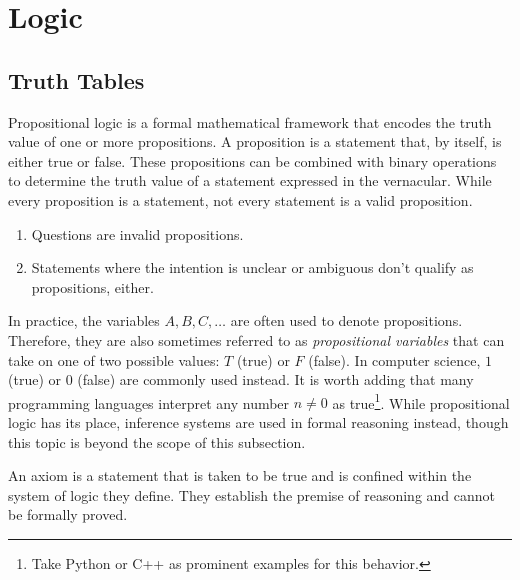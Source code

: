 \section{Logic}\label{sec-logic}


\subsection{Truth Tables}\label{subsec-truth-table}

Propositional logic is a formal mathematical framework that encodes the truth value
of one or more propositions. A proposition is a statement that, by itself, is either
true or false. These propositions can be combined with binary operations to determine
the truth value of a statement expressed in the vernacular. While every proposition
is a statement, not every statement is a valid proposition.

\begin{enumerate}
    \item Questions are invalid propositions.
    \item Statements where the intention is unclear or ambiguous don't qualify as propositions, either.
\end{enumerate}

In practice, the variables \(A,B,C,\dots\) are often used to denote propositions.
Therefore, they are also sometimes referred to as \emph{propositional variables}
that can take on one of two possible values: \(T\) (true) or \(F\) (false). In
computer science, \(1\) (true) or \(0\) (false) are commonly used instead. It is
worth adding that many programming languages interpret any number \(n\neq0\) as
true\footnote{Take Python or C++ as prominent examples for this behavior.}. While
propositional logic has its place, inference systems are used in formal reasoning
instead, though this topic is beyond the scope of this subsection.

\begin{definition}\label{def-axiom}
    An axiom is a statement that is taken to be true and is confined within the
    system of logic they define. They establish the premise of reasoning and cannot
    be formally proved.
\end{definition}

